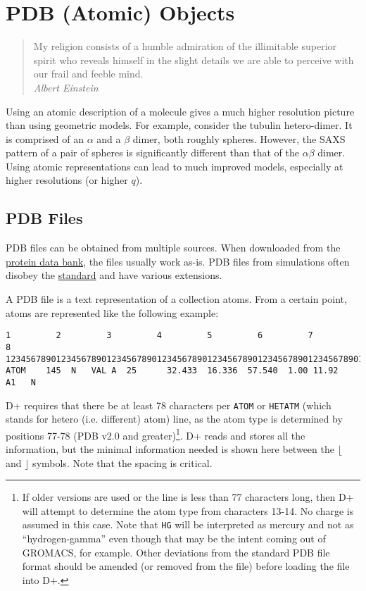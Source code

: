 \documentclass[../D+Manual.tex]{subfiles}
\begin{document}
\chapter{PDB (Atomic) Objects}

\begin{quote}
	My religion consists of a humble admiration of the illimitable superior spirit who reveals himself in the slight details we are able to perceive with our frail and feeble mind.\\
	\hspace*{\fill} \textit{Albert Einstein}
\end{quote}

Using an atomic description of a molecule gives a much higher resolution picture than using geometric models. For example, consider the tubulin hetero-dimer. It is comprised of an $\alpha$ and a $\beta$ dimer, both roughly spheres. However, the SAXS pattern of a pair of spheres is significantly different than that of the $\alpha\beta$ dimer. Using atomic representations can lead to much improved models, especially at higher resolutions (or higher $q$).


\section{PDB Files}

PDB files can be obtained from multiple sources. When downloaded from the \href{http://www.rcsb.org/pdb/home/home.do}{protein data bank}, the files usually work as-is. PDB files from simulations often disobey the \href{http://deposit.rcsb.org/adit/docs/pdb_atom_format.html#ATOM}{standard} and have various extensions.

A PDB file is a text representation of a collection atoms. From a certain point, atoms are represented like the following example:\\
\begin{lstlisting}[basicstyle=\tiny,breaklines=false,backgroundcolor=\color{gray!15},linewidth=1.07\linewidth]
         1         2         3         4         5         6         7         8
12345678901234567890123456789012345678901234567890123456789012345678901234567890
ATOM    145  N   VAL A  25      32.433  16.336  57.540  1.00 11.92      A1   N  
\end{lstlisting}

D+ requires that there be at least 78 characters per \texttt{ATOM} or \texttt{HETATM} (which stands for hetero (i.e. different) atom) line, as the atom type is determined by positions 77-78 (PDB v2.0 and greater)\footnote{If older versions are used or the line is less than 77 characters long, then D+ will attempt to determine the atom type from characters 13-14. No charge is assumed in this case. Note that \texttt{HG} will be interpreted as mercury and not as ``hydrogen-gamma'' even though that may be the intent coming out of GROMACS, for example. Other deviations from the standard
PDB file format should be amended (or removed from the file) before loading the file into D+.}. 
D+ reads and stores all the information, but the minimal information needed is shown here between the $\lfloor$ and $\rfloor$ symbols. Note that the spacing is critical.
\end{document}
